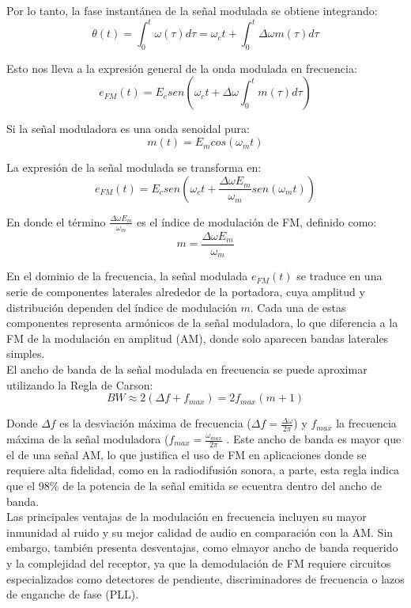 Por lo tanto, la fase instantánea de la señal modulada se obtiene integrando:
\[
\theta(t) = \int_0^t \omega(\tau) d\tau = \omega_c t + \int_0^t \Delta\omega m(\tau) d\tau
\]

Esto nos lleva a la expresión general de la onda modulada en frecuencia:
\[
 e_{FM}(t) = E_c sen \left( \omega_c t + \Delta\omega \int_0^t m(\tau) d\tau \right)
\]

Si la señal moduladora es una onda senoidal pura:
\[
m(t) = E_m cos(\omega_m t)
\]

La expresión de la señal modulada se transforma en:
\begin{equation}
e_{FM}(t) = E_c sen \left( \omega_c t + \frac{\Delta\omega E_m}{\omega_m} sen(\omega_m t) \right)
\end{equation}

En donde el término \( \frac{\Delta\omega E_m}{\omega_m} \) es el índice de modulación de FM, definido como:
\[
m = \frac{\Delta\omega E_m}{\omega_m}
\]

En el dominio de la frecuencia, la señal modulada \( e_{FM}(t) \) se traduce en una serie de componentes laterales alrededor de la portadora, cuya amplitud y distribución dependen del índice de modulación \( m \). Cada una de estas componentes representa armónicos de la señal moduladora, lo que diferencia a la FM de la modulación en amplitud (AM), donde solo aparecen bandas laterales simples.\\

El ancho de banda de la señal modulada en frecuencia se puede aproximar utilizando la Regla de Carson:
\[
BW \approx 2(\Delta f + f_{max}) = 2 f_{max} (m+1)
\]

Donde \( \Delta f \) es la desviación máxima de frecuencia (\(\Delta f = \frac{\Delta \omega}{2 \pi}\)) y \( f_{max} \) la frecuencia máxima de la señal moduladora  (\(f_{max}= \frac{\omega_{max}}{2 \pi}\)  . Este ancho de banda es mayor que el de una señal AM, lo que justifica el uso de FM en aplicaciones donde se requiere alta fidelidad, como en la radiodifusión sonora, a parte, esta regla indica que el 98\% de la potencia de la señal emitida se ecuentra dentro del ancho de banda.\\


Las principales ventajas de la modulación en frecuencia incluyen su mayor inmunidad al ruido y su mejor calidad de audio en comparación con la AM. Sin embargo, también presenta desventajas, como elmayor ancho de banda requerido y la complejidad del receptor, ya que la demodulación de FM requiere circuitos especializados como detectores de pendiente, discriminadores de frecuencia o lazos de enganche de fase (PLL).\\

